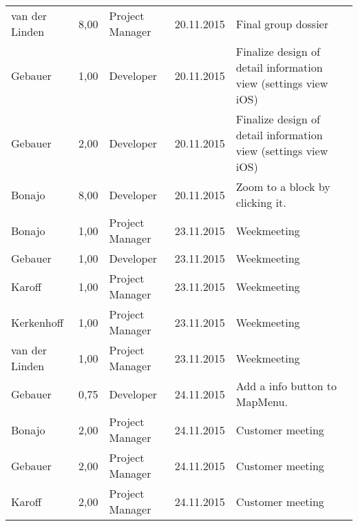 \begin{longtable}{ l r p{2cm} c p{4cm} }
		van der Linden          & 8,00           & Project Manager       & 20.11.2015    & Final group dossier                                                             \\
		Gebauer                 & 1,00           & Developer             & 20.11.2015    & Finalize design of detail information view (settings view iOS)                  \\
		Gebauer                 & 2,00           & Developer             & 20.11.2015    & Finalize design of detail information view (settings view iOS)                  \\
		Bonajo                  & 8,00           & Developer             & 20.11.2015    & Zoom to a block by clicking it.                                                 \\
		Bonajo                  & 1,00           & Project Manager       & 23.11.2015    & Weekmeeting                                                                     \\
		Gebauer                 & 1,00           & Developer             & 23.11.2015    & Weekmeeting                                                                     \\
		Karoff                  & 1,00           & Project Manager       & 23.11.2015    & Weekmeeting                                                                     \\
		Kerkenhoff              & 1,00           & Project Manager       & 23.11.2015    & Weekmeeting                                                                     \\
		van der Linden          & 1,00           & Project Manager       & 23.11.2015    & Weekmeeting                                                                     \\
		Gebauer                 & 0,75           & Developer             & 24.11.2015    & Add a info button to MapMenu.                                                   \\
		Bonajo                  & 2,00           & Project Manager       & 24.11.2015    & Customer meeting                                                                 \\
		Gebauer                 & 2,00           & Project Manager       & 24.11.2015    & Customer meeting                                                                 \\
		Karoff                  & 2,00           & Project Manager       & 24.11.2015    & Customer meeting                                                                 \\

\end{longtable}
